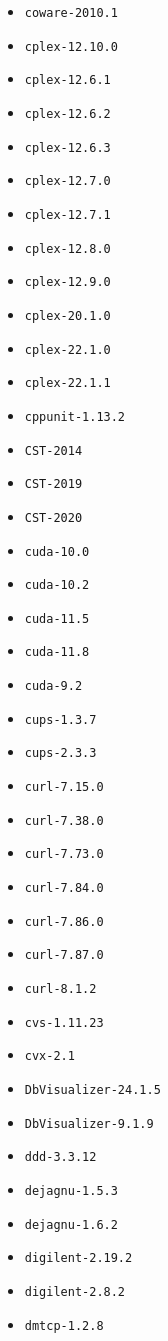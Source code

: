 \begin{multicols}{3}
\begin{itemize}
\item \verb|coware-2010.1|
\item \verb|cplex-12.10.0|
\item \verb|cplex-12.6.1|
\item \verb|cplex-12.6.2|
\item \verb|cplex-12.6.3|
\item \verb|cplex-12.7.0|
\item \verb|cplex-12.7.1|
\item \verb|cplex-12.8.0|
\item \verb|cplex-12.9.0|
\item \verb|cplex-20.1.0|
\item \verb|cplex-22.1.0|
\item \verb|cplex-22.1.1|
\item \verb|cppunit-1.13.2|
\item \verb|CST-2014|
\item \verb|CST-2019|
\item \verb|CST-2020|
\item \verb|cuda-10.0|
\item \verb|cuda-10.2|
\item \verb|cuda-11.5|
\item \verb|cuda-11.8|
\item \verb|cuda-9.2|
\item \verb|cups-1.3.7|
\item \verb|cups-2.3.3|
\item \verb|curl-7.15.0|
\item \verb|curl-7.38.0|
\item \verb|curl-7.73.0|
\item \verb|curl-7.84.0|
\item \verb|curl-7.86.0|
\item \verb|curl-7.87.0|
\item \verb|curl-8.1.2|
\item \verb|cvs-1.11.23|
\item \verb|cvx-2.1|
\item \verb|DbVisualizer-24.1.5|
\item \verb|DbVisualizer-9.1.9|
\item \verb|ddd-3.3.12|
\item \verb|dejagnu-1.5.3|
\item \verb|dejagnu-1.6.2|
\item \verb|digilent-2.19.2|
\item \verb|digilent-2.8.2|
\item \verb|dmtcp-1.2.8|

\end{itemize}
\end{multicols}
